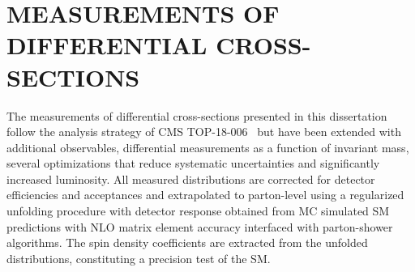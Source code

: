 
\chapter{MEASUREMENTS OF DIFFERENTIAL CROSS-SECTIONS}
\label{Measurements_of_Differential_Cross-sections}
The measurements of differential cross-sections presented in this dissertation follow the analysis strategy of CMS TOP-18-006~\cite{Sirunyan:2681777} but have been extended with additional observables, differential measurements as a function of \ttbar invariant mass, several optimizations that reduce systematic uncertainties and significantly increased luminosity.
All measured distributions are corrected for detector efficiencies and acceptances and extrapolated to parton-level using a regularized unfolding procedure with detector response obtained from MC simulated SM predictions with NLO matrix element accuracy interfaced with parton-shower algorithms.
The spin density coefficients are extracted from the unfolded distributions, constituting a precision test of the SM.

